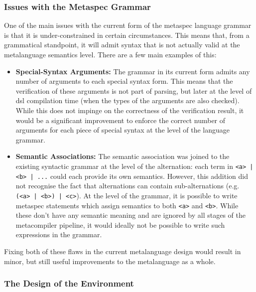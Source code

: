 \subsubsection{Issues with the Metaspec Grammar} %
\label{ssub:issues_with_the_metaspec_grammar}
One of the main issues with the current form of the \gls{metaspec} language grammar is that it is under-constrained in certain circumstances. 
This means that, from a grammatical standpoint, it will admit syntax that is not actually valid at the metalanguage semantics level.
There are a few main examples of this:
\begin{itemize}
    \item \textbf{Special-Syntax Arguments:} The grammar in its current form admits any number of arguments to each special syntax form. 
    This means that the verification of these arguments is not part of parsing, but later at the level of \gls{dsl} compilation time (when the types of the arguments are also checked).
    While this does not impinge on the correctness of the verification result, it would be a significant improvement to enforce the correct number of arguments for each piece of special syntax at the level of the language grammar. 
    \item \textbf{Semantic Associations:} The semantic association was joined to the existing syntactic grammar at the level of the alternation: each term in \texttt{<a> | <b> | ...} could each provide its own semantics.
    However, this addition did not recognise the fact that alternations can contain sub-alternations (e.g. \texttt{(<a> | <b>) | <c>}).
    At the level of the grammar, it is possible to write \gls{metaspec} statements which assign semantics to both \texttt{<a>} and \texttt{<b>}.
    While these don't have any semantic meaning and are ignored by all stages of the metacompiler pipeline, it would ideally not be possible to write such expressions in the grammar. 
\end{itemize}

Fixing both of these flaws in the current metalanguage design would result in minor, but still useful improvements to the metalanguage as a whole. 


\subsubsection{The Design of the Environment} %
\label{ssub:the_design_of_the_environment}

